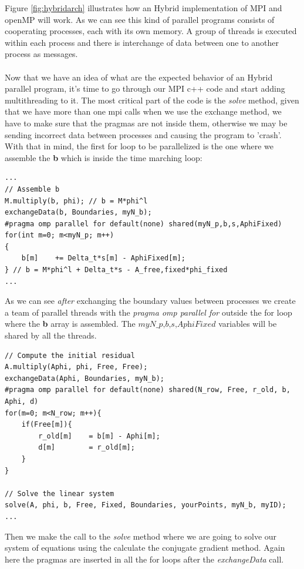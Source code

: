 \documentclass[12pt]{article}
\begin{document}
Figure \ref{fig:hybridarch} illustrates how an Hybrid implementation of MPI and openMP will work. As we can see this kind of parallel programs consists of cooperating processes, each with its own memory. A group of threads is executed within each process and there is interchange of data between one to another process as messages. 
\\\\
Now that we have an idea of what are the expected behavior of an Hybrid parallel program, it's time to go through our MPI c++ code and start adding multithreading to it. The most critical part of the code is the \textit{solve} method, given that we have more than one mpi calls when we use the exchange method, we have to make sure that the pragmas are not inside them, otherwise we may be sending incorrect data between processes and causing the program to 'crash'. With that in mind, the first for loop to be parallelized is the one where we assemble the \textbf{b} which is inside the time marching loop:

\begin{lstlisting}[style=MyC++Style]
...
// Assemble b
M.multiply(b, phi); // b = M*phi^l
exchangeData(b, Boundaries, myN_b);
#pragma omp parallel for default(none) shared(myN_p,b,s,AphiFixed)
for(int m=0; m<myN_p; m++)
{
	b[m]	+= Delta_t*s[m] - AphiFixed[m];
} // b = M*phi^l + Delta_t*s - A_free,fixed*phi_fixed
...
\end{lstlisting}

As we can see \textit{after} exchanging the boundary values between processes we create a team of parallel threads with the \textit{pragma omp parallel for} outside the for loop where the \textbf{b} array is assembled. The $\textit{myN\_p,b,s,AphiFixed}$ variables will be shared by all the threads.

\begin{lstlisting}[style=MyC++Style]
// Compute the initial residual
A.multiply(Aphi, phi, Free, Free);
exchangeData(Aphi, Boundaries, myN_b); 
#pragma omp parallel for default(none) shared(N_row, Free, r_old, b, Aphi, d)
for(m=0; m<N_row; m++){
	if(Free[m]){
		r_old[m]	= b[m] - Aphi[m];
		d[m]		= r_old[m];
	}
}

// Solve the linear system
solve(A, phi, b, Free, Fixed, Boundaries, yourPoints, myN_b, myID);
...
\end{lstlisting}

Then we make the call to the \textit{solve} method where we are going to solve our system of equations using the calculate the conjugate gradient method. Again here the pragmas are inserted in all the for loops after the \textit{exchangeData} call.
 
\end{document}
